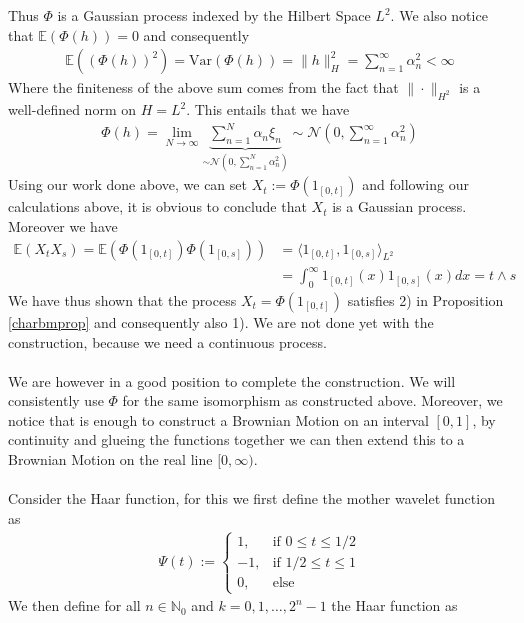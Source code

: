 \documentclass[11pt,a4paper, final]{article}
\theoremstyle{definition}
\begin{document}
Thus $\Phi$ is a Gaussian process indexed by the Hilbert Space $L^2$. We also notice that $\mathbb{E}( \Phi(h))=0$ and consequently 
\begin{align*}
\mathbb{E} ( ( \Phi(h))^2) = \text{Var}( \Phi(h))= \| h \|_H^2 = \sum_{n=1}^\infty \alpha_n^2 < \infty
\end{align*}
Where the finiteness of the above sum comes from the fact that $\| \cdot \|_{H^2}$ is a well-defined norm on $H=L^2.$ This entails that we have
\begin{align*}
\Phi(h)= \lim_{N \to \infty} \underbrace{\sum_{n=1}^N \alpha_n \xi_n}_{ \sim \mathcal{N}(0, \sum_{n=1}^N \alpha_n^2)} \sim \mathcal{N}\left( 0, \sum_{n=1}^\infty \alpha_n^2 \right)
\end{align*}
Using our work done above, we can set $X_t:= \Phi( 1_{[0,t]})$ and following our calculations above, it is obvious to conclude that $X_t$ is a Gaussian process. Moreover we have 
\begin{align*}
\mathbb{E}(X_t X_s) = \mathbb{E} \left( \Phi(1_{[0,t]}) \Phi(1_{[0,s]}) \right) &= \langle 1_{[0,t]},  1_{[0,s]}  \rangle_{L^2} \\ &= \int_0^\infty 1_{[0,t]}(x) 1_{[0,s]}(x) dx = t \wedge s  
\end{align*}
We have thus shown that the process $X_t = \Phi(1_{[0,t]})$ satisfies 2) in Proposition \ref{charbmprop} and consequently also 1). We are not done yet with the construction, because we need a continuous process. 
\\\\
We are however in a good position to complete the construction. We will consistently use $\Phi$ for the same isomorphism as constructed above. Moreover, we notice that is enough to construct a Brownian Motion on an interval $[0,1]$, by continuity and glueing the functions together we can then extend this to a Brownian Motion on the real line $[0, \infty)$.
\\\\
Consider the Haar function, for this we first define the mother wavelet function as 
\begin{align*}
\Psi (t) := \begin{cases}1, & \text{if } 0 \leq t \leq 1/2 \\
-1, & \text{if } 1/2 \leq t \leq 1 \\ 0, & \text{else} \end{cases}
\end{align*}
We then define for all $n \in \mathbb{N}_0$ and $k=0,1, \dots , 2^n-1$ the Haar function as 
\end{document}
